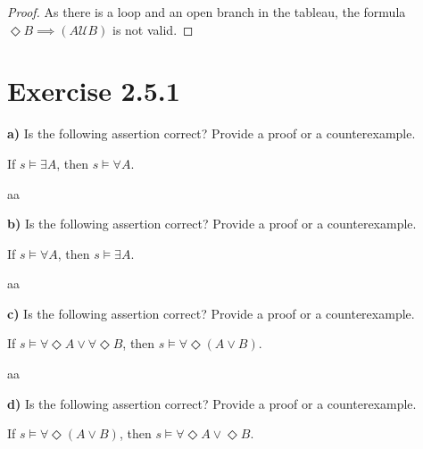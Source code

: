 \documentclass[titlepage, letterpaper, fleqn]{article}
\newcommand{\spacepls}{\vspace{5mm}}
\newcommand{\until}{\mathscr{U}}
\begin{document}
\spacepls


\begin{proof}
As there is a loop and an open branch in the tableau, the formula \(\Diamond B \implies (A \until B)\) is not valid.
\end{proof}

\section{Exercise 2.5.1}

{\large \textbf{a)} Is the following assertion correct? Provide a proof or a counterexample.

If \(s \models \exists A\), then \(s \models \forall A\).}

aa

{\large \textbf{b)} Is the following assertion correct? Provide a proof or a counterexample.

If \(s \models \forall A\), then \(s \models \exists A\).}

aa

{\large \textbf{c)} Is the following assertion correct? Provide a proof or a counterexample.

If \(s \models \forall \Diamond A \vee \forall \Diamond B\), then \(s \models \forall \Diamond (A \vee B)\).}

aa

{\large \textbf{d)} Is the following assertion correct? Provide a proof or a counterexample.

If \(s \models \forall \Diamond(A \vee B)\), then \(s \models \forall \Diamond A \vee \Diamond B\).}
\end{document}
